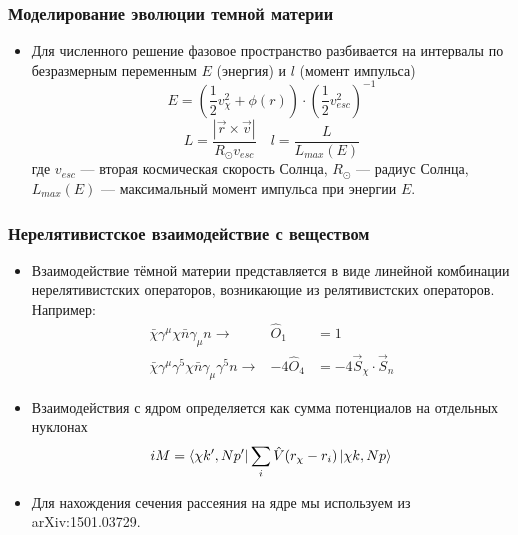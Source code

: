 \documentclass[
11pt,]{beamer}
\begin{document}
	
	\begin{frame}
	\frametitle{Моделирование эволюции темной материи}
	\begin{itemize}
	\item Для численного решение фазовое пространство разбивается на интервалы по безразмерным переменным $E$ (энергия) и $l$ (момент импульса)
	\begin{equation*}
			E = \left(\frac{1}{2} v_{\chi}^2 + \phi(r)\right)\cdot
			\left(\frac{1}{2} v_{esc}^2 \right)^{-1} 
	\end{equation*}		
	\begin{equation*}
			L = \frac{|\vec{r} \times \vec{v}|}
			{R_{\odot} v_{esc}} \quad l = \frac{L}{L_{max}(E)}
	\end{equation*}
	где $v_{esc}$ --- вторая космическая скорость Солнца, $R_{\odot}$ --- радиус Солнца, $L_{max}(E)$ --- максимальный момент импульса при энергии $E$.
\end{itemize}
	\end{frame}
	
	\begin{frame}
		\frametitle{Нерелятивистское взаимодействие с веществом}
		\begin{itemize}
	\item Взаимодействие тёмной материи представляется в виде линейной комбинации нерелятивистских операторов, возникающие из релятивистских операторов. Например:
	\begin{eqnarray*}
		\bar{\chi}\gamma^{\mu}\chi \bar{n}\gamma_{\mu}n \rightarrow& \hat{O}_1 &= 1 \\
		\bar{\chi}\gamma^{\mu}\gamma^{5}\chi \bar{n}\gamma_{\mu}\gamma^{5}n \rightarrow& -4\hat{O}_4  &= -4 \vec{S}_{\chi}\cdot\vec{S}_{n}
	\end{eqnarray*}
	\item Взаимодействия с ядром определяется как сумма потенциалов на отдельных нуклонах
	\begin{equation*}
		iM = \bra{\chi k',N p'} \sum_i{\hat{V}(r_{\chi} - r_{i})} \ket{\chi k,N p \vphantom{'}}
	\end{equation*}
	\item Для нахождения сечения рассеяния на ядре мы используем из arXiv:1501.03729.
\end{itemize}
	\end{frame}
	
\end{document}
